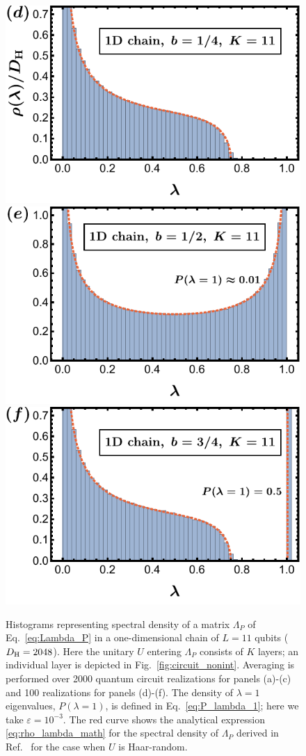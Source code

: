 \documentclass[%
 reprint,
 superscriptaddress,
 amsmath,amssymb,
prx,
]{revtex4-2}\href{\href{}{}}{}
\begin{document}
\begin{figure}[t]
	\includegraphics[width = 0.63\columnwidth]{1D_depth11_lam_W_distr_b14.pdf}\qquad
	\includegraphics[width = 0.63\columnwidth]{1D_depth11_lam_W_distr_b12.pdf}\qquad
	\includegraphics[width = 0.63\columnwidth]{1D_depth11_lam_W_distr_b34.pdf}
	\caption{Histograms representing spectral density of a matrix $\Lambda_P$ of Eq.~\eqref{eq:Lambda_P} in a one-dimensional chain of $L=11$ qubits ($D_{\rm H}=2048$).
    Here the unitary $U$ entering $\Lambda_P$ consists of $K$ layers; an individual layer is depicted in Fig.~\ref{fig:circuit_nonint}.
    Averaging is performed over 2000 quantum circuit realizations for panels (a)-(c) and 100 realizations for panels (d)-(f).
    The density of $\lambda=1$ eigenvalues, $P(\lambda=1)$, is defined in Eq.~\eqref{eq:P_lambda_1}; here we take $\varepsilon=10^{-3}$.
    The red curve shows the analytical expression \eqref{eq:rho_lambda_math} for the spectral density of $\Lambda_P$ derived in Ref.~\cite{Collins2005} for the case when $U$ is Haar-random.
	}
	\label{fig:W_eval_hist_1D}
\end{figure}
\end{document}
